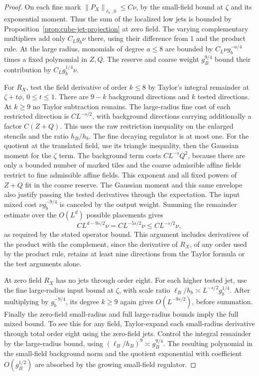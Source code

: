 \documentclass[11pt]{article}
\theoremstyle{definition}
\begin{document}
\begin{proof}
On each fine mark \(\|P_X\|_{\ell_b,0}\le C\nu\), by
the small-field bound at \(\zeta\) and its exponential moment.
Thus the sum of the localized low jets is bounded by
Proposition~\ref{prop:cube-jet-projection} at zero field.
The varying complementary multipliers add only \(C_Lg_b\nu\)
there, using their difference from \(1\) and the product rule.
At the large radius, monomials of degree \(a\le8\) are
bounded by \(C_L\nu g_b^{-a/4}\) times a fixed polynomial
in \(Z,Q\). The reserve and coarse weight \(g_B^{9/4}\)
bound their contribution by \(C_Lg_b^{1/4}\nu\).

For \(R_X\), test the field derivative of order \(k\le8\)
by Taylor's integral remainder at \(\zeta+t\phi\), \(0\le t\le1\).
There are \(9-k\) background directions and \(k\) tested
directions. At \(k\ge9\) no Taylor subtraction remains.
The large-radius fine cost of each restricted direction is
\(C L^{-s/2}\), with background directions carrying additionally
a factor \(C(Z+Q)\). This uses the raw restriction inequality
on the enlarged stencils and the ratio \(h_B/h_b\).
The fine decaying regulator is at most one. For the quotient
at the translated field, use its triangle inequality, then
the Gaussian moment for the \(\zeta\) term. The background
term costs \(C L^{-s}Q^2\), because there are only a bounded
number of marked tiles and the coarse admissible affine fields
restrict to fine admissible affine fields. This exponent and
all fixed powers of \(Z+Q\) fit in the coarse reserve.
The Gaussian moment and this same envelope also justify
passing the tested derivatives through the expectation.
The input mixed cost \(\nu g_b^{-9/4}\) is canceled by the
output weight. Summing the remainder estimate over the
\(O(L^d)\) possible placements gives
\begin{equation}
 C L^{d-9s/2}\nu=C L^{-5s/2}\nu\le C L^{-s/2}\nu ,
\end{equation}
as required by the stated operator bound.
This argument includes derivatives of the product with the
complement, since the derivative of \(R_X\), of any order
used by the product rule, retains at least nine directions
from the Taylor formula or the test arguments alone.

At zero field \(R_X\) has no jets through order eight.
For each higher tested jet, use the fine large-radius input
bound at \(\zeta\), with scale ratio
\(\ell_B/h_b\asymp L^{-s/2}g_b^{1/4}\).
After multiplying by \(g_b^{-9/4}\), its degree \(k\ge9\)
again gives \(O(L^{-9s/2})\), before summation.
Finally the zero-field small-radius and full large-radius
bounds imply the full mixed bound. To see this for any field,
Taylor-expand each small-radius derivative through total
order eight using the zero-field jets. Control the integral
remainder by the large-radius bound, using
\((\ell_B/h_B)^9\asymp g_B^{9/4}\).
The resulting polynomial in the small-field background norm
and the quotient exponential with coefficient \(O(g_B^{1/2})\)
are absorbed by the growing small-field regulator.
\end{proof}
\end{document}
